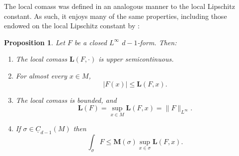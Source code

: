 \documentclass[reqno,11pt]{amsart}
\newcommand{\Chain}{\underline C}
\newcommand{\Mass}{\mathbf M}
\newcommand{\Comass}{\mathbf L}
\newtheorem{proposition}[theorem]{Proposition}
\theoremstyle{definition}
\numberwithin{equation}{section}
\begin{document}
The local comass was defined in an analogous manner to the local Lipschitz constant.
As such, it enjoys many of the same properties, including those endowed on the local Lipschitz constant by \cite[Lemma 4.3]{Crandall2008}:

\begin{proposition}\label{crandall}
Let $F$ be a closed $L^\infty$ $d - 1$-form. Then:
\begin{enumerate}
\item The local comass $\Comass(F, \cdot)$ is upper semicontinuous. \label{crandall usc}
\item For almost every $x \in M$, \label{crandall LDT}
$$|F(x)| \leq \Comass(F, x).$$
\item The local comass is bounded, and \label{crandall linfinity}
$$\Comass(F) = \sup_{x \in M} \Comass(F, x) = \|F\|_{L^\infty}.$$
\item If $\sigma \in \Chain_{d - 1}(M)$ then \label{crandall best curl is ABC}
$$\int_\sigma F \leq \Mass(\sigma) \sup_{x \in \sigma} \Comass(F, x).$$
\end{enumerate}
\end{proposition}
\end{document}

